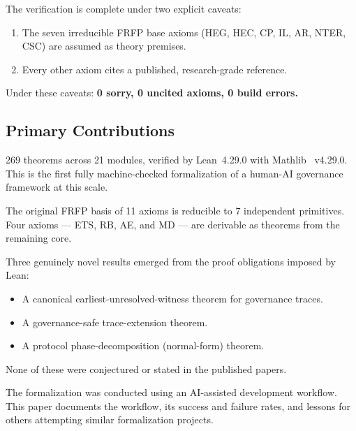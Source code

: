 The verification is complete under two explicit caveats:
\begin{enumerate}
  \item The seven irreducible FRFP base axioms (HEG, HEC, CP, IL, AR, NTER, CSC)
        are assumed as theory premises.
  \item Every other axiom cites a published, research-grade reference.
\end{enumerate}

Under these caveats: \textbf{0 sorry, 0 uncited axioms, 0 build errors.}

\subsection{Primary Contributions}

\begin{contribution}
269 theorems across 21 modules, verified by Lean~4.29.0 with Mathlib~\cite{Mathlib2020} v4.29.0.
This is the first fully machine-checked formalization of a human-AI governance
framework at this scale.
\end{contribution}

\begin{contribution}
The original FRFP basis of 11 axioms is reducible to 7 independent primitives.
Four axioms --- ETS, RB, AE, and MD --- are derivable as theorems from the
remaining core.
\end{contribution}

\begin{contribution}
Three genuinely novel results emerged from the proof obligations imposed by Lean:
\begin{itemize}
  \item A canonical earliest-unresolved-witness theorem for governance traces.
  \item A governance-safe trace-extension theorem.
  \item A protocol phase-decomposition (normal-form) theorem.
\end{itemize}
None of these were conjectured or stated in the published papers.
\end{contribution}

\begin{contribution}
The formalization was conducted using an AI-assisted development workflow. This
paper documents the workflow, its success and failure rates, and lessons for
others attempting similar formalization projects.
\end{contribution}

